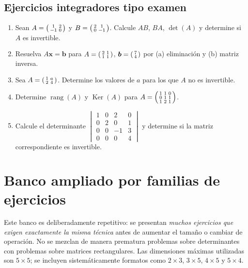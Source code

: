 \documentclass[12pt]{article}
\theoremstyle{remark}
\newcommand{\rang}{\operatorname{rang}}
\newcommand{\Ker}{\operatorname{Ker}}
\newcommand{\vect}[1]{\boldsymbol{#1}}
\newcounter{contadorEjercicio}
\newenvironment{listaejercicios}{\begin{enumerate}[label=\textbf{E\arabic*.},leftmargin=2.4em,itemsep=0.52em]\setcounter{enumi}{\value{contadorEjercicio}}}{\setcounter{contadorEjercicio}{\value{enumi}}\end{enumerate}}
\begin{document}
\subsection{Ejercicios integradores tipo examen}
\begin{listaejercicios}
\item Sean $A=\begin{psmallmatrix}1&2\\-1&0\end{psmallmatrix}$ y $B=\begin{psmallmatrix}2&1\\0&-1\end{psmallmatrix}$. Calcule $AB$, $BA$, $\det(A)$ y determine si $A$ es invertible.
\item Resuelva $A\vect x=\vect b$ para $A=\begin{psmallmatrix}2&1\\1&1\end{psmallmatrix}$, $\vect b=\begin{psmallmatrix}7\\4\end{psmallmatrix}$ por (a) eliminación y (b) matriz inversa.
\item Sea $A=\begin{psmallmatrix}1&a\\2&4\end{psmallmatrix}$. Determine los valores de $a$ para los que $A$ no es invertible.
\item Determine $\rang(A)$ y $\Ker(A)$ para $A=\begin{psmallmatrix}1&1&0\\0&1&1\\1&2&1\end{psmallmatrix}$.
\item Calcule el determinante $\begin{vmatrix}1&0&2&0\\0&2&0&1\\0&0&-1&3\\0&0&0&4\end{vmatrix}$ y determine si la matriz correspondiente es invertible.
\end{listaejercicios}

\section{Banco ampliado por familias de ejercicios}
\label{sec:banco-ampliado}
Este banco es deliberadamente repetitivo: se presentan \emph{muchos ejercicios que exigen exactamente la misma técnica} antes de aumentar el tamaño o cambiar de operación. No se mezclan de manera prematura problemas sobre determinantes con problemas sobre matrices rectangulares. Las dimensiones máximas utilizadas son $5\times5$; se incluyen sistemáticamente formatos como $2\times3$, $3\times5$, $4\times5$ y $5\times4$.
\end{document}
